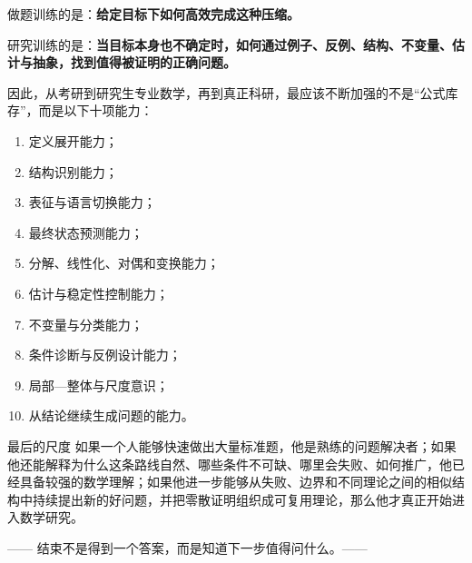 \documentclass[11pt,a4paper]{ctexart}
\begin{document}
做题训练的是：\textbf{给定目标下如何高效完成这种压缩。}

研究训练的是：\textbf{当目标本身也不确定时，如何通过例子、反例、结构、不变量、估计与抽象，找到值得被证明的正确问题。}

因此，从考研到研究生专业数学，再到真正科研，最应该不断加强的不是“公式库存”，而是以下十项能力：

\begin{enumerate}
  \item 定义展开能力；
  \item 结构识别能力；
  \item 表征与语言切换能力；
  \item 最终状态预测能力；
  \item 分解、线性化、对偶和变换能力；
  \item 估计与稳定性控制能力；
  \item 不变量与分类能力；
  \item 条件诊断与反例设计能力；
  \item 局部—整体与尺度意识；
  \item 从结论继续生成问题的能力。
\end{enumerate}

\begin{researchbox}{最后的尺度}
如果一个人能够快速做出大量标准题，他是熟练的问题解决者；如果他还能解释为什么这条路线自然、哪些条件不可缺、哪里会失败、如何推广，他已经具备较强的数学理解；如果他进一步能够从失败、边界和不同理论之间的相似结构中持续提出新的好问题，并把零散证明组织成可复用理论，那么他才真正开始进入数学研究。
\end{researchbox}

\vfill
\begin{center}
\color{slate}\small
—— 结束不是得到一个答案，而是知道下一步值得问什么。——
\end{center}
\end{document}
